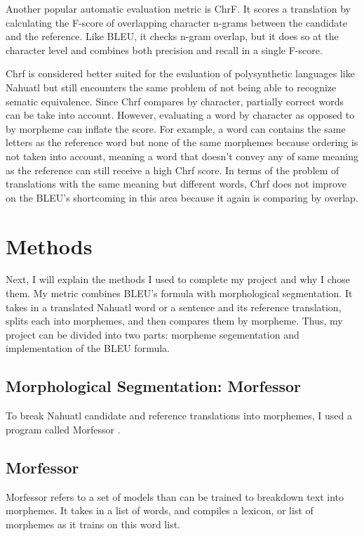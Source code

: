 \documentclass[10pt,twocolumn]{article}
\begin{document}
Another popular automatic evaluation metric is ChrF. It
scores a translation by calculating the F-score of overlapping character n-grams between the candidate and the reference. Like BLEU, it checks n-gram overlap, but it does so at the character level and combines both precision and recall in a single F-score.

Chrf is considered better suited for the evaluation of polysynthetic languages like Nahuatl but still encounters the same problem of not being able to recognize sematic equivalence. Since Chrf compares by character, partially correct words can be take into account. However, evaluating a word by character as opposed to by morpheme can inflate the score. For example, a word can contains the same letters as the reference word but  none of the same morphemes because ordering is not taken into account, meaning a word that doesn't convey any of same meaning as the reference can still receive a high Chrf score. In terms of the problem of translations with the same meaning but different words, Chrf does not improve on the BLEU's shortcoming in this area because it again is comparing by overlap. 

\section{Methods}

Next, I will explain the methods I used to complete my project and why I chose them. My metric combines BLEU's formula with morphological segmentation. It takes in a translated Nahuatl word or a sentence and its reference translation, splits each into morphemes, and then compares them by morpheme. Thus, my project can be divided into two parts: morpheme segementation and implementation of the BLEU formula. 


\subsection{Morphological Segmentation: Morfessor}

To break Nahuatl candidate and reference translations into morphemes, I used a program called Morfessor \cite{Morfessor}. 

\subsection{Morfessor}

Morfessor refers to a set of models than can be trained to breakdown text into morphemes. It takes in a list of words, and compiles a lexicon, or list of morphemes as it trains on this word list.
\end{document}
